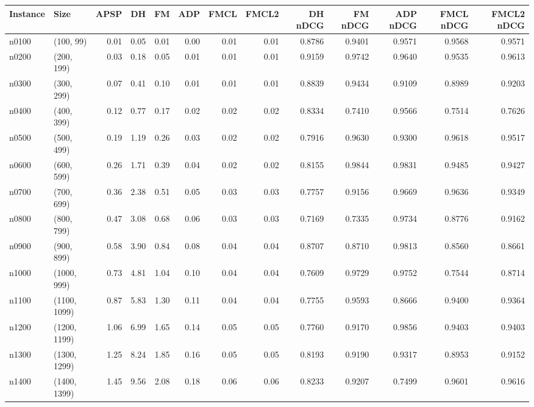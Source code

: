 \begin{tabular}{llrrrrrrrrrrr}
\toprule
Instance &         Size &  APSP &    DH &   FM &  ADP &  FMCL &  FMCL2 &  DH nDCG &  FM nDCG &  ADP nDCG &  FMCL nDCG &  FMCL2 nDCG \\
\midrule
   n0100 &    (100, 99) &  0.01 &  0.05 & 0.01 & 0.00 &  0.01 &   0.01 &   0.8786 &   0.9401 &    0.9571 &     0.9568 &      0.9571 \\
   n0200 &   (200, 199) &  0.03 &  0.18 & 0.05 & 0.01 &  0.01 &   0.01 &   0.9159 &   0.9742 &    0.9640 &     0.9535 &      0.9613 \\
   n0300 &   (300, 299) &  0.07 &  0.41 & 0.10 & 0.01 &  0.01 &   0.01 &   0.8839 &   0.9434 &    0.9109 &     0.8989 &      0.9203 \\
   n0400 &   (400, 399) &  0.12 &  0.77 & 0.17 & 0.02 &  0.02 &   0.02 &   0.8334 &   0.7410 &    0.9566 &     0.7514 &      0.7626 \\
   n0500 &   (500, 499) &  0.19 &  1.19 & 0.26 & 0.03 &  0.02 &   0.02 &   0.7916 &   0.9630 &    0.9300 &     0.9618 &      0.9517 \\
   n0600 &   (600, 599) &  0.26 &  1.71 & 0.39 & 0.04 &  0.02 &   0.02 &   0.8155 &   0.9844 &    0.9831 &     0.9485 &      0.9427 \\
   n0700 &   (700, 699) &  0.36 &  2.38 & 0.51 & 0.05 &  0.03 &   0.03 &   0.7757 &   0.9156 &    0.9669 &     0.9636 &      0.9349 \\
   n0800 &   (800, 799) &  0.47 &  3.08 & 0.68 & 0.06 &  0.03 &   0.03 &   0.7169 &   0.7335 &    0.9734 &     0.8776 &      0.9162 \\
   n0900 &   (900, 899) &  0.58 &  3.90 & 0.84 & 0.08 &  0.04 &   0.04 &   0.8707 &   0.8710 &    0.9813 &     0.8560 &      0.8661 \\
   n1000 &  (1000, 999) &  0.73 &  4.81 & 1.04 & 0.10 &  0.04 &   0.04 &   0.7609 &   0.9729 &    0.9752 &     0.7544 &      0.8714 \\
   n1100 & (1100, 1099) &  0.87 &  5.83 & 1.30 & 0.11 &  0.04 &   0.04 &   0.7755 &   0.9593 &    0.8666 &     0.9400 &      0.9364 \\
   n1200 & (1200, 1199) &  1.06 &  6.99 & 1.65 & 0.14 &  0.05 &   0.05 &   0.7760 &   0.9170 &    0.9856 &     0.9403 &      0.9403 \\
   n1300 & (1300, 1299) &  1.25 &  8.24 & 1.85 & 0.16 &  0.05 &   0.05 &   0.8193 &   0.9190 &    0.9317 &     0.8953 &      0.9152 \\
   n1400 & (1400, 1399) &  1.45 &  9.56 & 2.08 & 0.18 &  0.06 &   0.06 &   0.8233 &   0.9207 &    0.7499 &     0.9601 &      0.9616 \\

\end{tabular}
